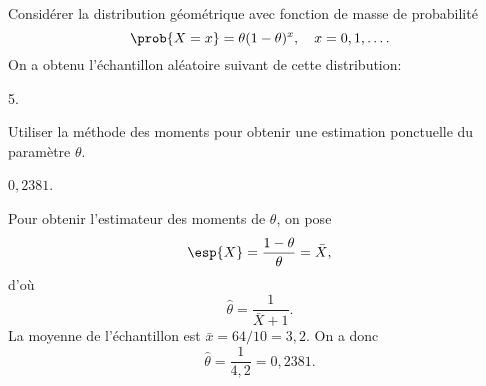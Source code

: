 \begin{exercice}
  Considérer la distribution géométrique avec fonction de masse de
  probabilité
  \begin{displaymath}
    \prob{X = x} = \theta (1 - \theta)^x, \quad x = 0, 1, \dots.
  \end{displaymath}
  On a obtenu l'échantillon aléatoire suivant de cette distribution:
  \begin{center}
    5.
  \end{center}
  Utiliser la méthode des moments pour obtenir une estimation
  ponctuelle du paramètre $\theta$.
  \begin{rep}
    $0,2381$.
  \end{rep}
  \begin{sol}
    Pour obtenir l'estimateur des moments de $\theta$, on pose
    \begin{equation*}
      \esp{X} = \frac{1 - \theta}{\theta} = \bar{X},
    \end{equation*}
    d'où
    \begin{equation*}
      \hat{\theta} = \frac{1}{\bar{X} + 1}.
    \end{equation*}
    La moyenne de l'échantillon est $\bar{x} = 64/10 = 3,2$. On a donc
    \begin{equation*}
      \hat{\theta} = \frac{1}{4,2} = 0,2381.
    \end{equation*}
  \end{sol}
\end{exercice}

